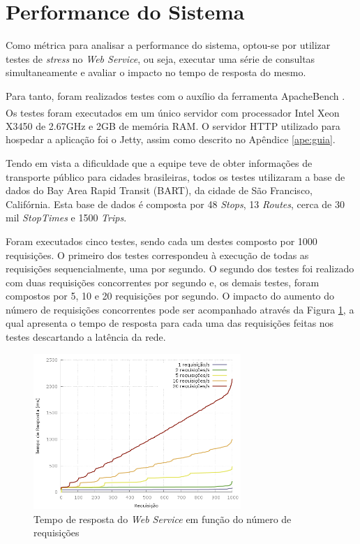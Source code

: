 \section{Performance do Sistema}
\label{sec:perf}
Como métrica para analisar a performance do sistema, optou-se por utilizar testes de \emph{stress} no \emph{Web Service}, ou seja, executar uma série de consultas simultaneamente e avaliar o impacto no tempo de resposta do mesmo.

Para tanto, foram realizados testes com o auxílio da ferramenta ApacheBench \cite{apachebench}.
Os testes foram executados em um único servidor com processador Intel{\textsuperscript\textregistered} Xeon{\textsuperscript\textregistered} X3450 de 2.67GHz e 2GB de memória RAM.
O servidor HTTP utilizado para hospedar a aplicação foi o Jetty, assim como descrito no Apêndice \ref{ape:guia}.

Tendo em vista a dificuldade que a equipe teve de obter informações de transporte público para cidades brasileiras, todos os testes utilizaram a base de dados do Bay Area Rapid Transit (BART), da cidade de São Francisco, Califórnia.
Esta base de dados é composta por 48 \emph{Stops}, 13 \emph{Routes}, cerca de 30 mil \emph{StopTimes} e 1500 \emph{Trips}.

Foram executados cinco testes, sendo cada um destes composto por 1000 requisições.
O primeiro dos testes correspondeu à execução de todas as requisições sequencialmente, uma por segundo.
O segundo dos testes foi realizado com duas requisições concorrentes por segundo e, os demais testes, foram compostos por 5, 10 e 20 requisições por segundo.
O impacto do aumento do número de requisições concorrentes pode ser acompanhado através da Figura \ref{fig:response}, a qual apresenta o tempo de resposta para cada uma das requisições feitas nos testes descartando a latência da rede.

\begin{figure}[!htb]
	\centering
	\includegraphics[width=0.7\textwidth]{./plots/stresstests/out.png}
	\caption[Tempo de resposta do \emph{Web Service}]{Tempo de resposta do \emph{Web Service} em função do número de requisições}
	\label{fig:response}
\end{figure}

